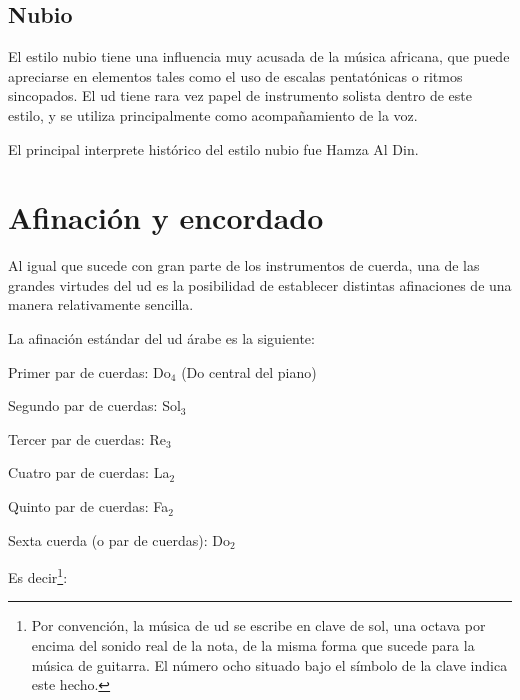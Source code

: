 
\subsection{Nubio}

El estilo nubio tiene una influencia muy acusada de la música africana, que puede apreciarse en elementos tales como el uso de escalas pentatónicas o ritmos sincopados. El ud tiene rara vez papel de instrumento solista dentro de este estilo, y se utiliza principalmente como acompañamiento de la voz.

El principal interprete histórico del estilo nubio fue Hamza Al Din.


\section{Afinación y encordado}

Al igual que sucede con gran parte de los instrumentos de cuerda, una de las grandes virtudes del ud es la posibilidad de establecer distintas afinaciones de una manera relativamente sencilla.

La afinación estándar del ud árabe es la siguiente:

\begin{compactitem}
    \item Primer par de cuerdas: Do$_4$ (Do central del piano)
    \item Segundo par de cuerdas: Sol$_3$
    \item Tercer par de cuerdas: Re$_3$
    \item Cuatro par de cuerdas: La$_2$
    \item Quinto par de cuerdas: Fa$_2$
    \item Sexta cuerda (o par de cuerdas): Do$_2$
\end{compactitem}

Es decir\footnote{Por convención, la música de ud se escribe en clave de sol, una octava por encima del sonido real de la nota, de la misma forma que sucede para la música de guitarra. El número ocho situado bajo el símbolo de la clave indica este hecho.}:

\begin{center}
\end{center}

